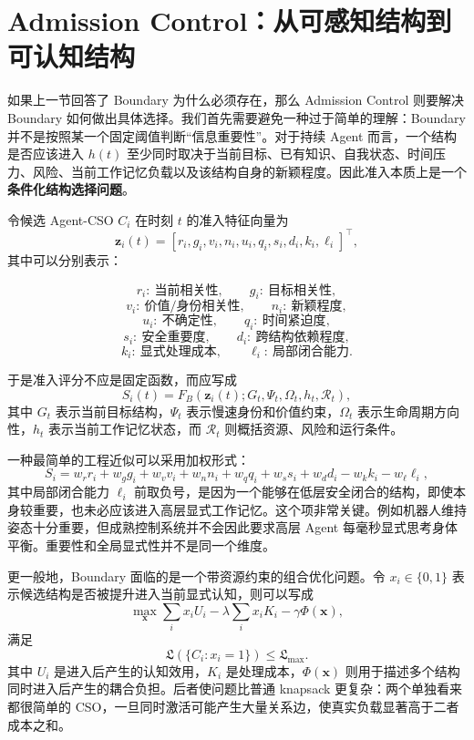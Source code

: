 \section{Admission Control：从可感知结构到可认知结构}

如果上一节回答了 Boundary 为什么必须存在，那么 Admission Control 则要解决 Boundary 如何做出具体选择。我们首先需要避免一种过于简单的理解：Boundary 并不是按照某一个固定阈值判断“信息重要性”。对于持续 Agent 而言，一个结构是否应该进入 $h(t)$ 至少同时取决于当前目标、已有知识、自我状态、时间压力、风险、当前工作记忆负载以及该结构自身的新颖程度。因此准入本质上是一个\textbf{条件化结构选择问题}。

令候选 Agent-CSO $C_i$ 在时刻 $t$ 的准入特征向量为
\[
\mathbf{z}_i(t)
=
[
r_i,
g_i,
v_i,
n_i,
u_i,
q_i,
s_i,
d_i,
k_i,
\ell_i
]^{\top},
\]
其中可以分别表示：

\[
r_i:\ \text{当前相关性},
\qquad
g_i:\ \text{目标相关性},
\]
\[
v_i:\ \text{价值/身份相关性},
\qquad
n_i:\ \text{新颖程度},
\]
\[
u_i:\ \text{不确定性},
\qquad
q_i:\ \text{时间紧迫度},
\]
\[
s_i:\ \text{安全重要度},
\qquad
d_i:\ \text{跨结构依赖程度},
\]
\[
k_i:\ \text{显式处理成本},
\qquad
\ell_i:\ \text{局部闭合能力}.
\]

于是准入评分不应是固定函数，而应写成
\[
S_i(t)
=
F_B
\left(
\mathbf{z}_i(t);
G_t,
\Psi_t,
\Omega_t,
h_t,
\mathcal{R}_t
\right),
\]
其中 $G_t$ 表示当前目标结构，$\Psi_t$ 表示慢速身份和价值约束，$\Omega_t$ 表示生命周期方向性，$h_t$ 表示当前工作记忆状态，而 $\mathcal{R}_t$ 则概括资源、风险和运行条件。

一种最简单的工程近似可以采用加权形式：
\[
S_i
=
w_r r_i
+
w_g g_i
+
w_v v_i
+
w_n n_i
+
w_q q_i
+
w_s s_i
+
w_d d_i
-
w_k k_i
-
w_{\ell}\ell_i,
\]
其中局部闭合能力 $\ell_i$ 前取负号，是因为一个能够在低层安全闭合的结构，即使本身较重要，也未必应该进入高层显式工作记忆。这个项非常关键。例如机器人维持姿态十分重要，但成熟控制系统并不会因此要求高层 Agent 每毫秒显式思考身体平衡。重要性和全局显式性并不是同一个维度。

更一般地，Boundary 面临的是一个带资源约束的组合优化问题。令 $x_i\in\{0,1\}$ 表示候选结构是否被提升进入当前显式认知，则可以写成
\[
\max_{\mathbf{x}}
\sum_i
x_i U_i
-
\lambda
\sum_i x_i K_i
-
\gamma
\Phi(\mathbf{x}),
\]
满足
\[
\mathfrak{L}
\left(
\{C_i:x_i=1\}
\right)
\le
\mathfrak{L}_{\max}.
\]
其中 $U_i$ 是进入后产生的认知效用，$K_i$ 是处理成本，$\Phi(\mathbf{x})$ 则用于描述多个结构同时进入后产生的耦合负担。后者使问题比普通 knapsack 更复杂：两个单独看来都很简单的 CSO，一旦同时激活可能产生大量关系边，使真实负载显著高于二者成本之和。

